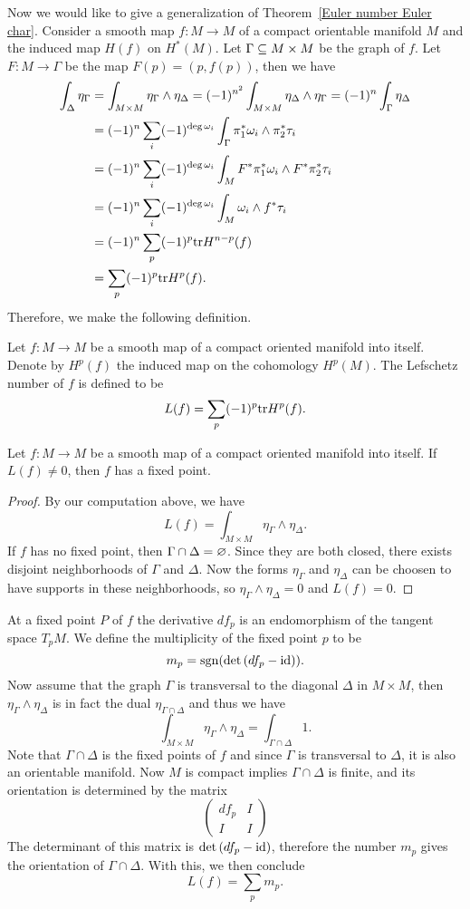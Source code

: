 Now we would like to give a generalization of Theorem~\ref{Euler number Euler char}. Consider a smooth map $f:M\to M$ of a compact orientable manifold $M$ and the 
induced map $H(f)$ on $H^*(M)$. Let $\Gamma\subseteq M\times M$ be the graph of $f$. Let $F:M\to\Gamma$ be the map $F(p)=(p,f(p))$, then we have
\begin{align*}
\int_\Delta\eta_\Gamma&=\int_{M\times M}\eta_\Gamma\wedge\eta_\Delta=(-1)^{n^2}\int_{M\times M}\eta_\Delta\wedge\eta_\Gamma=(-1)^n\int_\Gamma\eta_\Delta\\
&=(-1)^n\sum_i(-1)^{\deg\omega_i}\int_\Gamma\pi_1^*\omega_i\wedge\pi_2^*\tau_i\\
&=(-1)^n\sum_i(-1)^{\deg\omega_i}\int_M F^*\pi_1^*\omega_i\wedge F^*\pi_2^*\tau_i\\
&=(-1)^n\sum_i(-1)^{\deg\omega_i}\int_M\omega_i\wedge f^*\tau_i\\
&=(-1)^n\sum_p(-1)^{p}\mathrm{tr} H^{n-p}(f)\\
&=\sum_p(-1)^p\mathrm{tr} H^p(f).
\end{align*}
Therefore, we make the following definition.
\begin{definition}
Let $f:M\to M$ be a smooth map of a compact oriented manifold into itself. Denote by $H^p(f)$ the induced map on the cohomology $H^p(M)$. The Lefschetz number of $f$ is 
defined to be
\[L(f)=\sum_p(-1)^p\mathrm{tr} H^p(f).\]
\end{definition}
\begin{theorem}
Let $f:M\to M$ be a smooth map of a compact oriented manifold into itself. If $L(f)\neq 0$, then $f$ has a fixed point.
\end{theorem}
\begin{proof}
By our computation above, we have
\[L(f)=\int_{M\times M}\eta_\Gamma\wedge\eta_\Delta.\]
If $f$ has no fixed point, then $\Gamma\cap\Delta=\varnothing$. Since they are both closed, there exists disjoint neighborhoods of $\Gamma$ and $\Delta$. Now the forms 
$\eta_\Gamma$ and $\eta_\Delta$ can be choosen to have supports in these neighborhoods, so $\eta_\Gamma\wedge\eta_\Delta=0$ and $L(f)=0$. 
\end{proof}
At a fixed point $P$ of $f$ the derivative $df_p$ is an endomorphism of the tangent space $T_pM$. We define the multiplicity of the fixed point $p$ to be
\[m_p=\mathrm{sgn}(\mathrm{det}\,(df_p-\mathrm{id})).\]
Now assume that the graph $\Gamma$ is transversal to the diagonal $\Delta$ in $M\times M$, then $\eta_\Gamma\wedge\eta_\Delta$ is in fact the dual $\eta_{\Gamma\cap\Delta}$ 
and thus we have
\[\int_{M\times M}\eta_\Gamma\wedge\eta_\Delta=\int_{\Gamma\cap\Delta}1.\]
Note that $\Gamma\cap\Delta$ is the fixed points of $f$ and since $\Gamma$ is transversal to $\Delta$, it is also an orientable manifold. Now $M$ is compact implies 
$\Gamma\cap\Delta$ is finite, and its orientation is determined by the matrix
\[\begin{pmatrix}
df_p&I\\
I&I
\end{pmatrix}\]
The determinant of this matrix is $\mathrm{det}\,(df_p-\mathrm{id})$, therefore the number $m_p$ gives the orientation of $\Gamma\cap\Delta$. With this, we then conclude
\[L(f)=\sum_pm_p.\]
